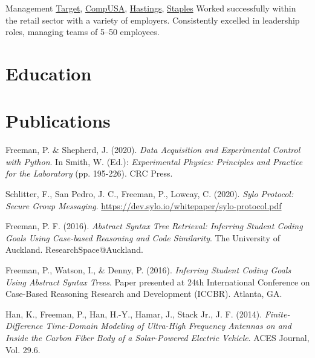 \documentclass[a4paper]{twentysecondcv}
\begin{document}
\begin{twenty}
    {}
    {Management}
    {\href{https://www.target.com/}{Target},
    \href{https://en.wikipedia.org/wiki/CompUSA}{CompUSA},
    \href{https://en.wikipedia.org/wiki/Hastings\_Entertainment}{Hastings},
    \href{https://www.staples.com/}{Staples}}
    {}
    {Worked successfully within the retail sector with a variety of employers.
    Consistently excelled in leadership roles, managing teams of 5--50
    employees.}

\end{twenty}

\section{Education}
\begin{twenty}
\end{twenty}

\section{Publications}

Freeman, P. \& Shepherd, J. (2020). \emph{Data Acquisition and Experimental
Control with Python}. In Smith, W. (Ed.): \emph{Experimental Physics: Principles and Practice for the
Laboratory} (pp. 195-226). CRC Press.

Schlitter, F., San Pedro, J. C., Freeman, P., Lowcay, C. (2020). \emph{Sylo
Protocol: Secure Group Messaging}. \href{https://dev.sylo.io/whitepaper/sylo-protocol.pdf}{https://dev.sylo.io/whitepaper/sylo-protocol.pdf}

Freeman, P. F. (2016). \emph{Abstract Syntax Tree Retrieval: Inferring Student
Coding Goals Using Case-based Reasoning and Code Similarity}. The University of
Auckland. ResearchSpace@Auckland.

Freeman, P., Watson, I., \& Denny, P. (2016). \emph{Inferring Student Coding
Goals Using Abstract Syntax Trees}. Paper presented at 24th International
Conference on Case-Based Reasoning Research and Development (ICCBR). Atlanta, GA.\@

Han, K., Freeman, P., Han, H.-Y., Hamar, J., Stack Jr., J. F. (2014).
\emph{Finite-Difference Time-Domain Modeling of Ultra-High Frequency Antennas
on and Inside the Carbon Fiber Body of a Solar-Powered Electric Vehicle}. ACES
Journal, Vol. 29.6.
\end{document}
